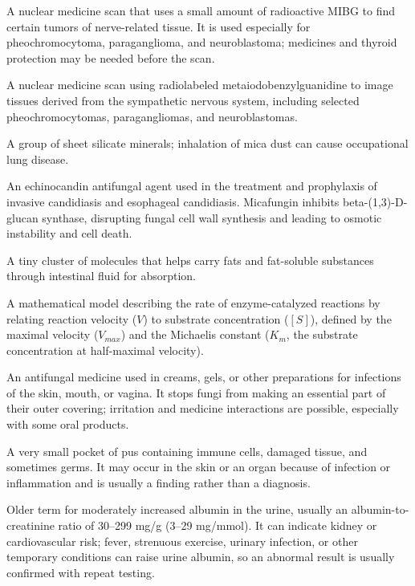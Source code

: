  A nuclear medicine scan that uses a small amount of radioactive MIBG to find certain tumors of nerve-related tissue. It is used especially for pheochromocytoma, paraganglioma, and neuroblastoma; medicines and thyroid protection may be needed before the scan.

 A nuclear medicine scan using radiolabeled metaiodobenzylguanidine to image tissues derived from the sympathetic nervous system, including selected pheochromocytomas, paragangliomas, and neuroblastomas.

 A group of sheet silicate minerals; inhalation of mica dust can cause occupational lung disease.

 An echinocandin antifungal agent used in the treatment and prophylaxis of invasive
candidiasis and esophageal candidiasis. Micafungin inhibits beta-(1,3)-D-glucan
synthase, disrupting fungal cell wall synthesis and leading to osmotic instability and
cell death.

 A tiny cluster of molecules that helps carry fats and fat-soluble substances through intestinal fluid for absorption.

 A mathematical model describing the rate of enzyme-catalyzed reactions by relating reaction velocity ($V$) to substrate concentration ($[S]$), defined by the maximal velocity ($V_{max}$) and the Michaelis constant ($K_m$, the substrate concentration at half-maximal velocity).

 An antifungal medicine used in creams, gels, or other preparations for infections of the skin, mouth, or vagina. It stops fungi from making an essential part of their outer covering; irritation and medicine interactions are possible, especially with some oral products.

 A very small pocket of pus containing immune cells, damaged tissue, and sometimes germs. It may occur in the skin or an organ because of infection or inflammation and is usually a finding rather than a diagnosis.

 Older term for moderately increased albumin in the urine, usually an albumin-to-creatinine ratio of 30--299 mg/g (3--29 mg/mmol). It can indicate kidney or cardiovascular risk; fever, strenuous exercise, urinary infection, or other temporary conditions can raise urine albumin, so an abnormal result is usually confirmed with repeat testing.

